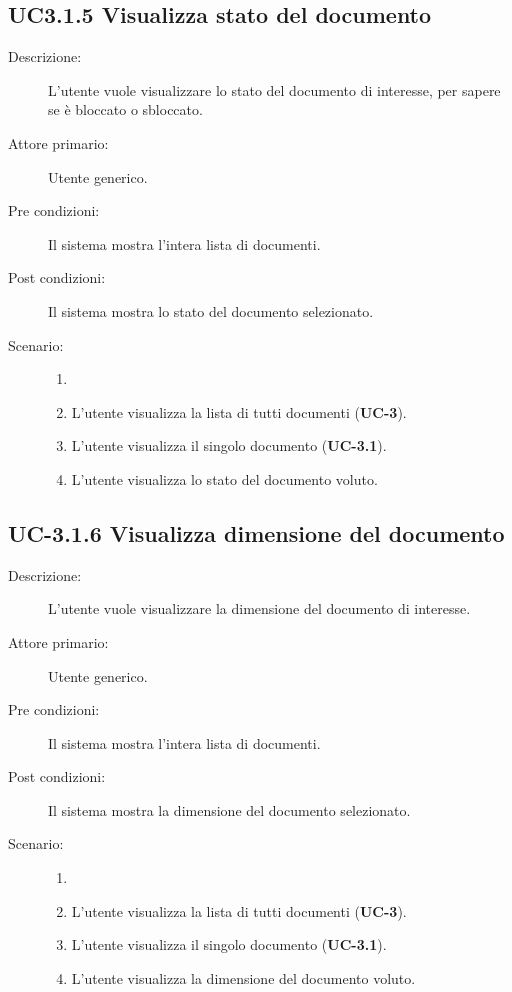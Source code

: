 \subsection{UC3.1.5 Visualizza stato del documento}
\begin{description}
    \item[Descrizione:] L'utente vuole visualizzare lo stato del documento di interesse, per sapere se è bloccato o sbloccato.
    \item[Attore primario:] Utente generico.
    \item[Pre condizioni:] Il sistema mostra l’intera lista di documenti.
    \item[Post condizioni:] Il sistema mostra lo stato del documento selezionato.
    \item[Scenario:]
    \begin{enumerate}
        \item[]
        \item L’utente visualizza la lista di tutti documenti (\textbf{UC-3}).
        \item L'utente visualizza il singolo documento (\textbf{UC-3.1}).
        \item L'utente visualizza lo stato del documento voluto.
    \end{enumerate}
\end{description}

\subsection{UC-3.1.6 Visualizza dimensione del documento}
\begin{description}
    \item[Descrizione:] L'utente vuole visualizzare la dimensione del documento di interesse.
    \item[Attore primario:] Utente generico.
    \item[Pre condizioni:] Il sistema mostra l’intera lista di documenti.
    \item[Post condizioni:] Il sistema mostra la dimensione del documento selezionato.
    \item[Scenario:]
    \begin{enumerate}
        \item[]
        \item L’utente visualizza la lista di tutti documenti (\textbf{UC-3}).
        \item L'utente visualizza il singolo documento (\textbf{UC-3.1}).
        \item L'utente visualizza la dimensione del documento voluto.
    \end{enumerate}
\end{description}

